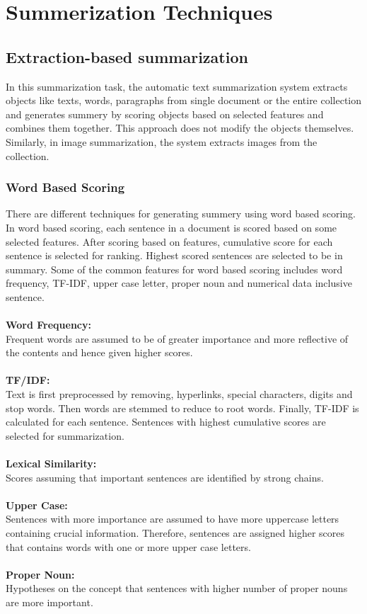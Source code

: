\documentclass[conference]{IEEEtran}
\begin{document}
\section{Summerization Techniques}
\subsection{Extraction-based summarization}
In this summarization task, the automatic text summarization system extracts objects like texts, words, paragraphs from single document or the entire collection and generates summery by scoring objects based on selected features and combines them together. This approach does not modify the objects themselves. Similarly, in image summarization, the system extracts images from the collection.\\
\subsubsection{Word Based Scoring}
There are different techniques for generating summery using word based scoring. In word based scoring, each sentence in a document is scored based on some selected features. After scoring based on features, cumulative score for each sentence is selected for ranking. Highest scored sentences are selected to be in summary. Some of the common features for word based scoring includes word frequency, TF-IDF, upper case letter, proper noun and numerical data inclusive sentence.\\\\
\textbf{Word Frequency:}\\
Frequent words are assumed to be of greater importance and more reflective of the contents and hence given higher scores.\\\\
\textbf{TF/IDF:}\\
Text is first preprocessed by removing, hyperlinks, special characters, digits and stop words. Then words are stemmed to reduce to root words. Finally, TF-IDF is calculated for each sentence. Sentences with highest cumulative scores are selected for summarization.\\\\
\textbf{Lexical Similarity:}\\
Scores assuming that important sentences are identified by strong chains.\\\\
\textbf{Upper Case:}\\
Sentences with more importance are assumed to have more uppercase letters containing crucial information. Therefore, sentences are assigned higher scores that contains words with one or more upper case letters.\\\\
\textbf{Proper Noun:}\\
Hypotheses on the concept that sentences with higher number of proper nouns are more important.\\\\
\end{document}
